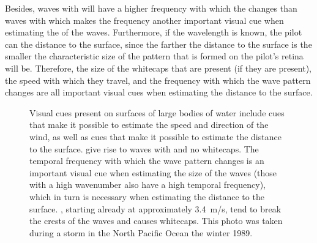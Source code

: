 Besides, waves with  will have a higher frequency with which the  changes than waves with  which makes the frequency another important visual cue when estimating the  of the waves. Furthermore, if the wavelength is known, the pilot can \estimate the distance to the surface, since the farther the distance to the surface is the smaller the characteristic size of the pattern that is formed on the pilot's retina will be. Therefore, the size of the whitecaps that are present (if they are present), the speed with which they travel, and the frequency with which the wave pattern changes are all important visual cues when estimating the distance to the surface.

\begin{figure}
    \centering
    \caption{Visual cues present on surfaces of large bodies of water include cues that make it possible to estimate the speed and direction of the wind, as well as cues that make it possible to estimate the distance to the surface.   give rise to waves with  and no whitecaps. The temporal frequency with which the wave pattern changes is an important visual cue when estimating the size of the waves (those with a high wavenumber also have a high temporal frequency), which in turn is necessary when estimating the distance to the surface.  , starting already at approximately 3.4~m/s, tend to break the crests of the waves and causes whitecaps. This photo was taken during a storm in the North Pacific Ocean the winter 1989.}
    \label{fig:sea_states}
\end{figure}

